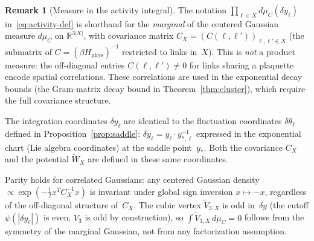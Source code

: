\documentclass[11pt]{article}
\theoremstyle{definition}
\newtheorem{remark}[theorem]{Remark}
\newcommand{\R}{\mathbb{R}}
\begin{document}
\begin{remark}[Measure in the activity integral]
\label{rem:measure-precision}
The notation $\prod_{\ell\in X}d\mu_C(\delta y_\ell)$
in~\eqref{eq:activity-def} is shorthand for the
\emph{marginal} of the centered Gaussian measure $d\mu_C$
on $\R^{3|X|}$, with covariance matrix
$C_X=(C(\ell,\ell'))_{\ell,\ell'\in X}$
(the submatrix of $C=(\beta H_{\mathrm{phys}})^{-1}$
restricted to links in~$X$).  This is \emph{not} a
product measure: the off-diagonal entries
$C(\ell,\ell')\ne 0$ for links sharing a plaquette
encode spatial correlations.  These correlations are
used in the exponential decay bounds
(the Gram-matrix decay bound in
Theorem~\ref{thm:cluster}), which require the full
covariance structure.

The integration coordinates $\delta y_\ell$ are
identical to the fluctuation coordinates
$\delta\theta_\ell$ defined in
Proposition~\ref{prop:saddle}: $\delta y_\ell
=y_\ell\cdot y_{*,\ell}^{-1}$ expressed in the
exponential chart (Lie algebra coordinates) at the
saddle point~$y_*$.  Both the covariance $C_X$ and
the potential $\widetilde{W}_X$ are defined in these
same coordinates.

Parity holds for correlated Gaussians:
any centered Gaussian density
$\propto\exp(-\frac{1}{2}x^T C_X^{-1}x)$
is invariant under global sign inversion
$x\mapsto -x$, regardless of the off-diagonal
structure of~$C_X$.  The cubic vertex
$\widetilde{V}_{3,X}$ is odd in~$\delta y$
(the cutoff $\psi(|\delta y_\ell|)$ is even,
$V_3$ is odd by construction), so
$\int\widetilde{V}_{3,X}\,d\mu_C=0$ follows
from the symmetry of the marginal Gaussian,
not from any factorization assumption.
\end{remark}
\end{document}
